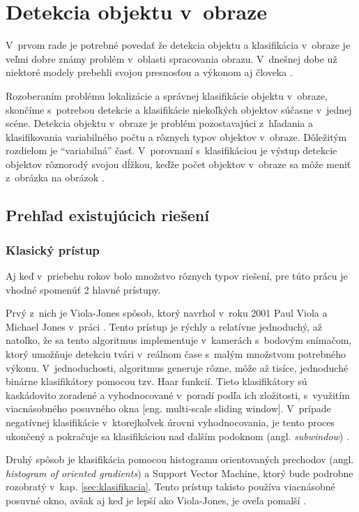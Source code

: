 
\section{Detekcia objektu v~obraze}
\label{sec:detekcia}

V~prvom rade je potrebné povedať že detekcia objektu a klasifikácia v~obraze je veľmi dobre známy problém v~oblasti spracovania obrazu.
V~dnešnej dobe už niektoré modely prebehli svojou presnosťou a výkonom aj človeka \cite{prop:NNvsHuman}.

Rozoberaním problému lokalizácie a správnej klasifikácie objektu v~obraze, skončíme s~potrebou
    detekcie a klasifikácie niekoľkých objektov súčasne v~jednej scéne.
Detekcia objektu v~obraze je problém pozostavajúci z~hľadania a klasifikovania variabilného počtu a rôznych typov objektov v~obraze.
Dôležitým rozdielom je ``variabilná'' časť. V~porovnaní s~klasifikáciou je výstup detekcie objektov rôznorodý svojou dĺžkou, keďže
    počet objektov v~obraze sa môže meniť z~obrázka na obrázok \cite{odkaz:ObjectDetectionOverview}.

\subsection{Prehľad existujúcich riešení}

\subsubsection{Klasický prístup}
Aj keď v~priebehu rokov bolo množstvo rôznych typov riešení, pre túto prácu je vhodné spomenúť 2 hlavné prístupy.

Prvý z~nich je Viola-Jones spôsob, ktorý navrhol v~roku 2001 Paul Viola a Michael Jones v~práci \cite{prop:Viola2001RobustRF}.
Tento prístup je rýchly a relatívne jednoduchý, až natoľko, že sa tento algoritmus implementuje v~kamerách s~bodovým snímačom, ktorý umožňuje
    detekciu tvári v~reálnom čase s~malým množstvom potrebného výkonu.
V~jednoduchosti, algoritmus generuje rôzne, môže až tisíce, jednoduché binárne klasifikátory pomocou tzv. Haar funkcií.
Tieto klasifikátory sú kaskádovito zoradené a vyhodnocované v~poradí podľa ich zložitosti, s~využitím viacnásobného posuvného okna [eng. multi-scale sliding window].
V~prípade negatívnej klasifikácie v~ktorejkoľvek úrovni vyhodnocovania, je tento proces ukončený a pokračuje sa klasifikáciou nad ďalším podoknom (angl. \textit{subwindow}) \cite{prop:Viola2001RobustRF}.

Druhý spôsob je klasifikácia pomocou histogramu orientovaných prechodov (angl. \textit{histogram of oriented gradients}) a Support Vector Machine, ktorý bude podrobne
    rozobratý v~kap. \ref{sec:klasifikacia}. Tento prístup takisto používa viacnásobné posuvné okno, avšak aj keď je lepší ako Viola-Jones, je oveľa pomalší \cite{odkaz:ObjectDetectionOverview}.

